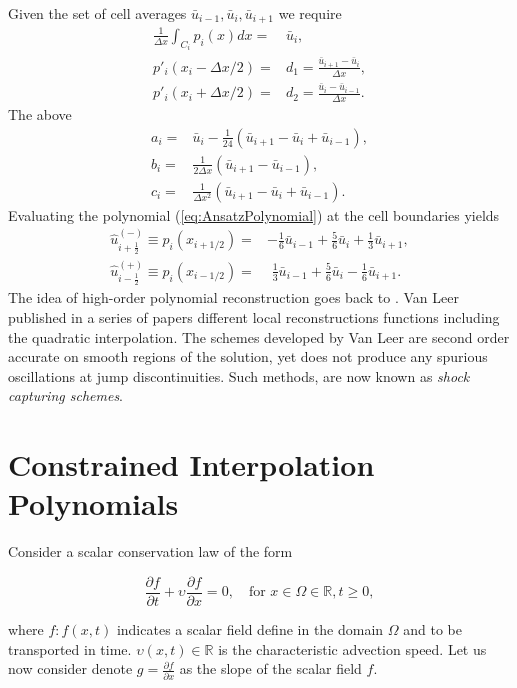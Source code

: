 \documentclass[10pt,a4paper]{article}
\newcommand{\pd}[2]{\frac{\partial #1}{\partial #2}}
\begin{document}
Given the set of cell averages ${\bar{u}_{i-1}},\bar{u}_{i},\bar{u}_{i+1}$ we require
%
\begin{align}
	\frac{1}{\Delta x} \int_{C_i} p_i(x)dx =& \bar{u}_i, \\
	p'_i(x_i-\Delta x/2) =& d_1 =  \frac{\bar{u}_{i+1}-\bar{u}_{i}}{\Delta x}, \\
	p'_i(x_i+\Delta x/2) =& d_2 =  \frac{\bar{u}_{i}-\bar{u}_{i-1}}{\Delta x}.
\end{align}
%
The above 
%
\begin{align}
	a_i=& \bar{u}_i -\frac{1}{24}(\bar{u}_{i+1}- \bar{u}_i+\bar{u}_{i-1}), \\
	b_i=& \frac{1}{2\Delta x} (\bar{u}_{i+1} -\bar{u}_{i-1}), \\
	c_i=& \frac{1}{\Delta x^2} (\bar{u}_{i+1}- \bar{u}_i+\bar{u}_{i-1}).
\end{align}
%
Evaluating the polynomial (\ref{eq:AnsatzPolynomial}) at the cell boundaries yields
%
\begin{align}
	\hat{u}_{i+\frac{1}{2}}^{(-)}\equiv p_i(x_{i+1/2})=&
	-\frac{1}{6}\bar{u}_{i-1}
	+\frac{5}{6}\bar{u}_{ i }
	+\frac{1}{3}\bar{u}_{i+1}, \\
	\hat{u}_{i-\frac{1}{2}}^{(+)}\equiv p_i(x_{i-1/2})=&
	\,\,\frac{1}{3}\bar{u}_{i-1}
	+\frac{5}{6}\bar{u}_{ i }  
	-\frac{1}{6}\bar{u}_{i+1}.
\end{align}
%
The idea of high-order polynomial reconstruction goes back to \cite{VanLeer1974II}. Van Leer published in a series of papers different local reconstructions functions including the quadratic interpolation. The schemes developed by Van Leer are second order accurate  on smooth regions of the solution, yet does not produce any spurious oscillations at jump discontinuities. Such methods, are now known as \emph{shock capturing schemes}.


\section{Constrained Interpolation Polynomials}
\label{sec:CIP}

Consider a scalar conservation law of the form
%
\begin{linenomath}
\begin{equation}
	\pd{f}{t} + \upsilon \pd{f}{x} = 0, 
	\quad\text{for } x\in\Omega\in\mathbb{R},t\geqslant0, 
	\label{eq:scalarTransport}
\end{equation}
\end{linenomath}
%
where $f:f(x,t)$ indicates a scalar field define in the domain $\Omega$ and to be transported in time. $\upsilon(x,t)\in\mathbb{R}$ is the characteristic advection speed. Let us now consider denote $g=\pd{f}{x}$ as the slope of the scalar field $f$. 
\end{document}
